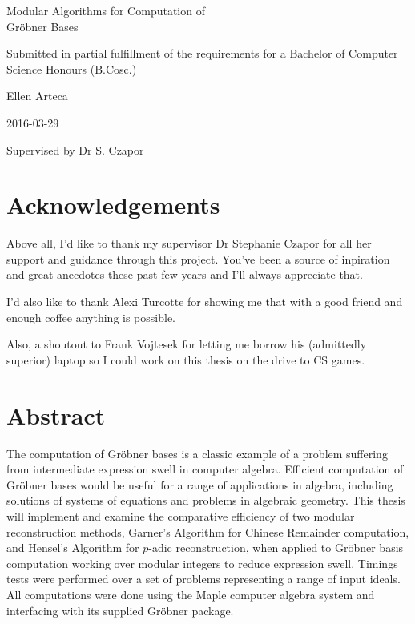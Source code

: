 \documentclass[letterpaper,12pt,titlepage,oneside,final]{book}
\begin{document}
\thispagestyle{empty}
\begin{center}
\begin{minipage}{0.75\linewidth}
    \centering
    {\LARGE Modular Algorithms for Computation of \\Gr\"obner Bases\par}
    \vspace{5cm}
    { Submitted in partial fulfillment of the requirements for a Bachelor of Computer Science Honours (B.Cosc.)\par}
    \vspace{5cm}
    {\large Ellen Arteca\par}
    {\large 2016-03-29\par}
    \vspace{2cm}
    { Supervised by Dr S. Czapor\par}
\end{minipage}
\end{center}
\clearpage

\frontmatter

\chapter*{Acknowledgements}%
%


Above all, I'd like to thank my supervisor Dr Stephanie Czapor for all her support and guidance through this project.  You've been a source of inpiration and great anecdotes these past few years and I'll always appreciate that.


I'd also like to thank Alexi Turcotte for showing me that with a good friend and enough coffee anything is possible. %


\noindent Also, a shoutout to Frank Vojtesek for letting me borrow his (admittedly superior) laptop so I could work on this thesis on the drive to CS games.


\chapter*{Abstract}%
%

The computation of Gr\"obner bases is a classic example of a problem suffering from intermediate expression swell in computer algebra.  Efficient computation of Gr\"obner bases would be useful for a range of applications in algebra, including solutions of systems of equations and problems in algebraic geometry.  This thesis will implement and examine the comparative efficiency of two modular reconstruction methods, Garner's Algorithm for Chinese Remainder computation, and Hensel's Algorithm for ${p}$-adic reconstruction, when applied to Gr\"obner basis computation working over modular integers to reduce expression swell.  Timings tests were performed over a set of problems representing a range of input ideals.  All computations were done using the Maple computer algebra system and interfacing with its supplied Gr\"obner package. 
\end{document}
